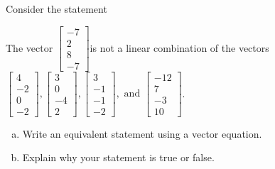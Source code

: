 
\begin{exerciseStatement}


Consider the statement 
\begin{center}\begin{minipage}{0.8\textwidth}
 The vector \( \left[\begin{array}{c}
-7 \\
2 \\
8 \\
-7
\end{array}\right] \)is not a linear combination of the vectors \( \left[\begin{array}{c}
4 \\
-2 \\
0 \\
-2
\end{array}\right] , \left[\begin{array}{c}
3 \\
0 \\
-4 \\
2
\end{array}\right] , \left[\begin{array}{c}
3 \\
-1 \\
-1 \\
-2
\end{array}\right] , \text{ and } \left[\begin{array}{c}
-12 \\
7 \\
-3 \\
10
\end{array}\right] \). 
\end{minipage}\end{center}
    


\begin{enumerate}[(a)]
\item  Write an equivalent statement using a vector equation.
\item  Explain why your statement is true or false.
\end{enumerate}
    
\end{exerciseStatement}
    
